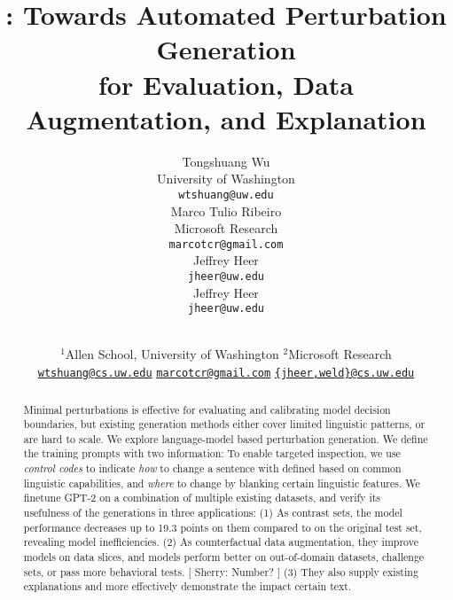 \documentclass[11pt,a4paper]{article}
\title{\sysname: Towards Automated Perturbation Generation \\for Evaluation, Data Augmentation, and Explanation}
\author{
Tongshuang Wu \\
  University of Washington \\
  \texttt{wtshuang@uw.edu} \\\And
Marco Tulio Ribeiro \\
  Microsoft Research \\
  \texttt{marcotcr@gmail.com} \\\And
Jeffrey Heer \\
  \texttt{jheer@uw.edu} \\\And
Jeffrey Heer \\
  \texttt{jheer@uw.edu} \\
}
\author{
\makecell{
Tongshuang Wu$^{1}$ ~~~~~~~ 
Marco Tulio Ribeiro$^{2}$ ~~~~~~~ 
Jeffrey Heer$^{1}$ ~~~~~ 
Daniel S. Weld$^{1}$}  \\ 
$^{1}$Allen School, University of Washington\hspace{5mm}
$^{2}$Microsoft Research\hspace{5mm} \\ 
\href{mailto:wtshuang@cs.uw.edu}{\texttt {wtshuang@cs.uw.edu}}
\hspace{2mm}
\href{mailto:marcotcr@microsoft.com}{\texttt {marcotcr@gmail.com}}
\hspace{2mm}
\href{mailto:dan@cs.washington.edu}{\texttt {\{jheer,weld\}@cs.uw.edu}}
}
\date{}
\newcommand{\tagstrs}{control codes\xspace}
\newcommand{\note}[2]{\xspace{\color{#1}[ #2 ]}\xspace}
\newcommand{\wts}[1]{\note{violet}{Sherry: #1}}
\begin{document}
\maketitle
\begin{abstract}
Minimal perturbations is effective for evaluating and calibrating model decision boundaries, but existing generation methods either cover limited linguistic patterns, or are hard to scale.
We explore language-model based perturbation generation.
We define the training prompts with two information:
To enable targeted inspection, we use \emph{\tagstrs} to indicate \emph{how} to change a sentence with defined based on common linguistic capabilities, and \emph{where} to change by blanking certain linguistic features.
We finetune GPT-2 on a combination of multiple existing datasets,  and verify its usefulness of the generations in three applications:
(1) As contrast sets, the model performance decreases up to 19.3 points on them compared to on the original test set, revealing model inefficiencies.
(2) As counterfactual data augmentation, they improve models on data slices, and models perform better on out-of-domain datasets, challenge sets, or pass more behavioral tests.
\wts{Number?}
(3) They also supply existing explanations and more effectively demonstrate the impact certain text.
\end{abstract}











\clearpage
\newpage

\appendix





\end{document}

